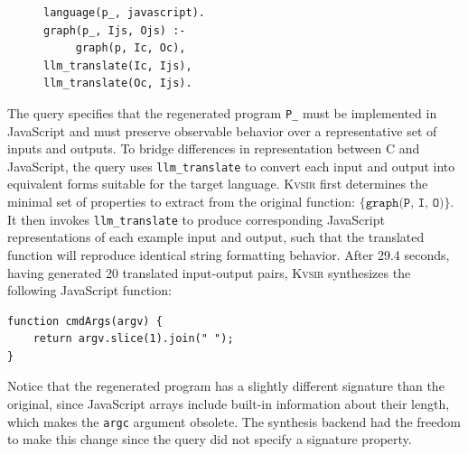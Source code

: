 \documentclass[sigplan,review,anonymous,10pt]{acmart}
\newcommand{\sys}{{\scshape Kv{\textalpha}sir}\xspace}
\newcommand{\ttt}[1]{\texttt{#1}\xspace}
\begin{document}
\begin{figure}
\begin{verbatim}
language(p_, javascript).
graph(p_, Ijs, Ojs) :-
     graph(p, Ic, Oc),
llm_translate(Ic, Ijs),
llm_translate(Oc, Ijs).
\end{verbatim}
\end{figure}
The query specifies that the regenerated program \texttt{P\_} must be
implemented in JavaScript and must preserve observable behavior over a
representative set of inputs and outputs.
To bridge differences in
representation between C and JavaScript, the query uses \texttt{llm\_translate}
to convert each input and output into equivalent forms suitable for the target language.
\sys first determines the minimal set of properties to extract from the
original function: $\{\texttt{graph(P, I, O)}\}$.
It then invokes \texttt{llm\_translate} to produce
corresponding JavaScript representations of each example input and output, such
that the translated function will reproduce identical string formatting
behavior.
After 29.4 seconds, having generated 20 translated input-output pairs, \sys synthesizes the following JavaScript function:

\begin{verbatim}
function cmdArgs(argv) {
    return argv.slice(1).join(" ");
}
\end{verbatim}
Notice that the regenerated program has a slightly different signature than the original, 
since JavaScript arrays include built-in information about their length,
which makes the \ttt{argc} argument obsolete.
The synthesis backend had the freedom to make this change since the query did not specify a signature property.
\end{document}
